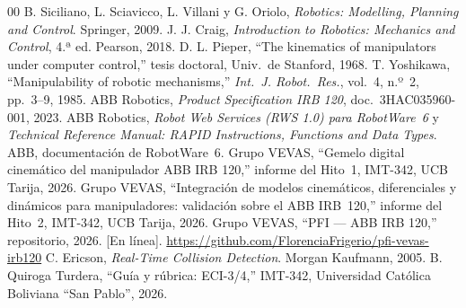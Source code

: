 \documentclass[conference]{IEEEtran}
\begin{document}
\begin{thebibliography}{00}
 B. Siciliano, L. Sciavicco, L. Villani y G. Oriolo,
\textit{Robotics: Modelling, Planning and Control}. Springer, 2009.
 J. J. Craig, \textit{Introduction to Robotics: Mechanics
and Control}, 4.ª ed. Pearson, 2018.
 D. L. Pieper, ``The kinematics of manipulators under
computer control,'' tesis doctoral, Univ.\ de Stanford, 1968.
 T. Yoshikawa, ``Manipulability of robotic mechanisms,''
\textit{Int.\ J. Robot.\ Res.}, vol.~4, n.º~2, pp.~3--9, 1985.
 ABB Robotics, \textit{Product Specification IRB 120},
doc.\ 3HAC035960-001, 2023.
 ABB Robotics, \textit{Robot Web Services (RWS 1.0) para
RobotWare~6} y \textit{Technical Reference Manual: RAPID Instructions,
Functions and Data Types}. ABB, documentación de RobotWare~6.
 Grupo VEVAS, ``Gemelo digital cinemático del manipulador
ABB IRB 120,'' informe del Hito~1, IMT-342, UCB Tarija, 2026.
 Grupo VEVAS, ``Integración de modelos cinemáticos,
diferenciales y dinámicos para manipuladores: validación sobre el ABB
IRB~120,'' informe del Hito~2, IMT-342, UCB Tarija, 2026.
 Grupo VEVAS, ``PFI --- ABB IRB 120,'' repositorio, 2026.
[En línea]. \url{https://github.com/FlorenciaFrigerio/pfi-vevas-irb120}
 C. Ericson, \textit{Real-Time Collision Detection}. Morgan
Kaufmann, 2005.
 B. Quiroga Turdera, ``Guía y rúbrica: ECI-3/4,''
IMT-342, Universidad Católica Boliviana ``San Pablo'', 2026.
\end{thebibliography}
\end{document}
